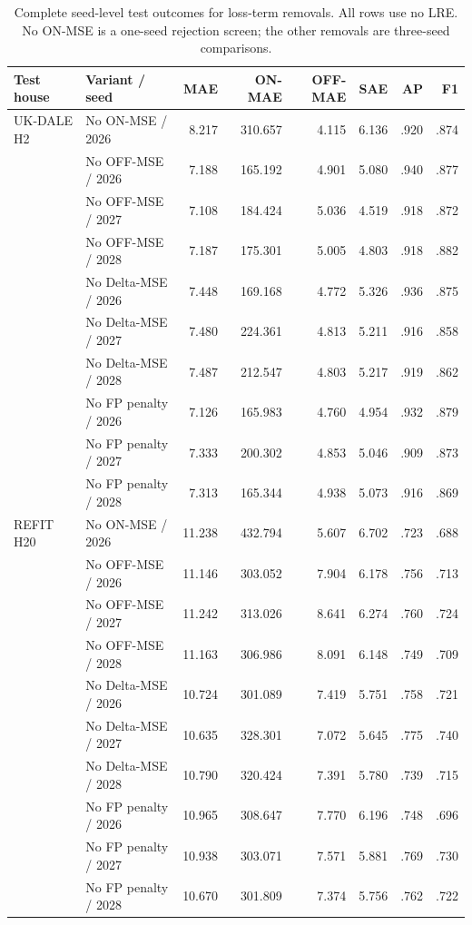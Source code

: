 \documentclass[conference]{IEEEtran}
\begin{document}
\begin{table}[!t]
\caption{Complete seed-level test outcomes for loss-term removals.  All rows use no LRE.  No ON-MSE is a one-seed rejection screen; the other removals are three-seed comparisons.}
\label{tab:appendix-term-seeds}
\centering\scriptsize
\begin{tabular}{llrrrrrr}
\toprule
Test house & Variant / seed & MAE & ON-MAE & OFF-MAE & SAE & AP & F1 \\
\midrule
UK-DALE H2 & No ON-MSE / 2026 & 8.217 & 310.657 & 4.115 & 6.136 & .920 & .874 \\
& No OFF-MSE / 2026 & 7.188 & 165.192 & 4.901 & 5.080 & .940 & .877 \\
& No OFF-MSE / 2027 & 7.108 & 184.424 & 5.036 & 4.519 & .918 & .872 \\
& No OFF-MSE / 2028 & 7.187 & 175.301 & 5.005 & 4.803 & .918 & .882 \\
& No Delta-MSE / 2026 & 7.448 & 169.168 & 4.772 & 5.326 & .936 & .875 \\
& No Delta-MSE / 2027 & 7.480 & 224.361 & 4.813 & 5.211 & .916 & .858 \\
& No Delta-MSE / 2028 & 7.487 & 212.547 & 4.803 & 5.217 & .919 & .862 \\
& No FP penalty / 2026 & 7.126 & 165.983 & 4.760 & 4.954 & .932 & .879 \\
& No FP penalty / 2027 & 7.333 & 200.302 & 4.853 & 5.046 & .909 & .873 \\
& No FP penalty / 2028 & 7.313 & 165.344 & 4.938 & 5.073 & .916 & .869 \\
\midrule
REFIT H20 & No ON-MSE / 2026 & 11.238 & 432.794 & 5.607 & 6.702 & .723 & .688 \\
& No OFF-MSE / 2026 & 11.146 & 303.052 & 7.904 & 6.178 & .756 & .713 \\
& No OFF-MSE / 2027 & 11.242 & 313.026 & 8.641 & 6.274 & .760 & .724 \\
& No OFF-MSE / 2028 & 11.163 & 306.986 & 8.091 & 6.148 & .749 & .709 \\
& No Delta-MSE / 2026 & 10.724 & 301.089 & 7.419 & 5.751 & .758 & .721 \\
& No Delta-MSE / 2027 & 10.635 & 328.301 & 7.072 & 5.645 & .775 & .740 \\
& No Delta-MSE / 2028 & 10.790 & 320.424 & 7.391 & 5.780 & .739 & .715 \\
& No FP penalty / 2026 & 10.965 & 308.647 & 7.770 & 6.196 & .748 & .696 \\
& No FP penalty / 2027 & 10.938 & 303.071 & 7.571 & 5.881 & .769 & .730 \\
& No FP penalty / 2028 & 10.670 & 301.809 & 7.374 & 5.756 & .762 & .722 \\
\bottomrule
\end{tabular}
\end{table}
\end{document}
